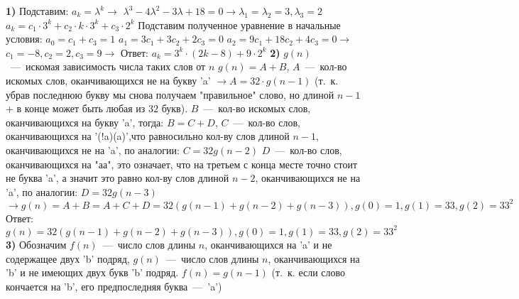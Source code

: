 \documentclass[12pt,a4paper,fleqn]{article}
\begin{document}
{\bf 1)} Подставим: $a_k = \lambda^k \rightarrow$ \newline
$\lambda^3 - 4\lambda^2 - 3\lambda + 18 = 0 \rightarrow \lambda_1 = \lambda_2 = 3, \lambda_3 = 2$ \newline
$a_k = c_1 \cdot 3^k + c_2 \cdot k \cdot 3^k + c_3 \cdot 2 ^k$ \newline
Подставим полученное уравнение в начальные условия: \newline
$a_0 = c_1 + c_3 = 1$ \newline
$a_1 = 3c_1 + 3c_2 + 2c_3 = 0$ \newline
$a_2 = 9c_1 + 18c_2 + 4c_3 = 0 \rightarrow$ \newline
$c_1 = -8, c_2 = 2, c_3 = 9 \rightarrow$ \newline
Ответ: $a_k = 3^k \cdot (2k - 8) + 9 \cdot 2^k$ \newline \newline
{\bf 2)} $g(n)$~---~искомая зависимость числа таких слов от $n$ \newline
$g(n) = A + B$, $A$~---~кол-во искомых слов, оканчивающихся не на букву 'a' $\rightarrow A = 32\cdot g(n - 1)$ (т.~к. убрав последнюю букву мы снова получаем "правильное" слово, но длиной $n - 1$ + в конце может быть любая из $32$ букв).\newline
$B$~---~кол-во искомых слов, оканчивающихся на букву 'a', тогда: \newline
$B = C + D$, $C$~---~кол-во слов, оканчивающихся на '(!a)(a)',что равносильно кол-ву слов длиной $n - 1$, оканчивающихся не на 'a', по аналогии: $C = 32g(n - 2)$ \newline
$D$~---~кол-во слов, оканчивающихся на "аа", это означает, что на третьем с конца месте точно стоит не буква 'a', а значит это равно кол-ву слов длиной $n - 2$, оканчивающихся не на 'a', по аналогии: $D = 32g(n - 3)$ \newline
$\rightarrow g(n) = A + B = A + C + D = 32(g (n - 1) + g(n - 2) + g( n - 3)), g(0) = 1, g(1) = 33, g(2) = 33^2$ \newline
Ответ: $g(n) = 32(g (n - 1) + g(n - 2) + g( n - 3)), g(0) = 1, g(1) = 33, g(2) = 33^2$ \newline \newline
{\bf 3)} Обозначим $f(n)$~---~число слов длины $n$, оканчивающихся на 'a' и не содержащее двух 'b' подряд, $g(n)$~---~число слов длины $n$, оканчивающихся на 'b' и не имеющих двух букв 'b' подряд. \newline
$f(n) = g(n - 1)$ (т.~к. если слово кончается на 'b', его предпоследняя буква~---~'a') \newline
\end{document}
